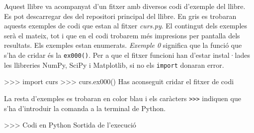 Aquest llibre va acompanyat d'un fitxer amb diversos codi d'exemple del llibre. Es pot descarregar des del repositori principal del llibre. En gris es trobaran aquests exemples de codi que estan al fitxer \emph{curs.py}. El contingut dels exemples serà el mateix, tot i que en el codi trobarem més impresions per pantalla dels resultats. Els exemples estan enumerats. \emph{Exemple 0} significa que la funció que s'ha de cridar és la {\tt ex000()}. Per a que el fitxer funcioni han d'estar instal·lades les llibreries NumPy, SciPy i Matplotlib, si no els {\tt import} donaran error.

\begin{blockcode}
>>> import curs
>>> curs.ex000()
Has aconseguit cridar el fitxer de codi
\end{blockcode}

La resta d'exemples es trobaran en color blau i els caràcters {\tt >>>} indiquen que s'ha d'introduir la comanda a la terminal de Python. 

\begin{blockcode}
>>> Codi en Python
Sortida de l'execució
\end{blockcode}


